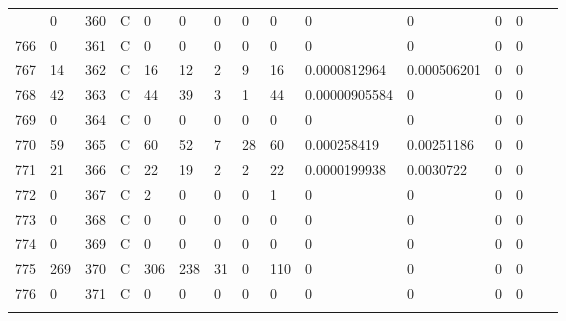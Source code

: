 \begin{longtable}{lllllllllllllll}
\begin{comment}
	765 & 0                 & 360 & C   & 0                 & 0                 & 0                 & 0    & 0          & 0              & 0              & 0             & 0            \\
	766 & 0                 & 361 & C   & 0                 & 0                 & 0                 & 0    & 0          & 0              & 0              & 0             & 0            \\
	767 & 14                & 362 & C   & 16                & 12                & 2                 & 9    & 16         & 0.0000812964   & 0.000506201    & 0             & 0            \\
	768 & 42                & 363 & C   & 44                & 39                & 3                 & 1    & 44         & 0.00000905584  & 0              & 0             & 0            \\
	769 & 0                 & 364 & C   & 0                 & 0                 & 0                 & 0    & 0          & 0              & 0              & 0             & 0            \\
	770 & 59                & 365 & C   & 60                & 52                & 7                 & 28   & 60         & 0.000258419    & 0.00251186     & 0             & 0            \\
	771 & 21                & 366 & C   & 22                & 19                & 2                 & 2    & 22         & 0.0000199938   & 0.0030722      & 0             & 0            \\
	772 & 0                 & 367 & C   & 2                 & 0                 & 0                 & 0    & 1          & 0              & 0              & 0             & 0            \\
	773 & 0                 & 368 & C   & 0                 & 0                 & 0                 & 0    & 0          & 0              & 0              & 0             & 0            \\
	774 & 0                 & 369 & C   & 0                 & 0                 & 0                 & 0    & 0          & 0              & 0              & 0             & 0            \\
	775 & 269               & 370 & C   & 306               & 238               & 31                & 0    & 110        & 0              & 0              & 0             & 0            \\
	776 & 0                 & 371 & C   & 0                 & 0                 & 0                 & 0    & 0          & 0              & 0              & 0             & 0            \\

\end{comment}
\end{longtable}
